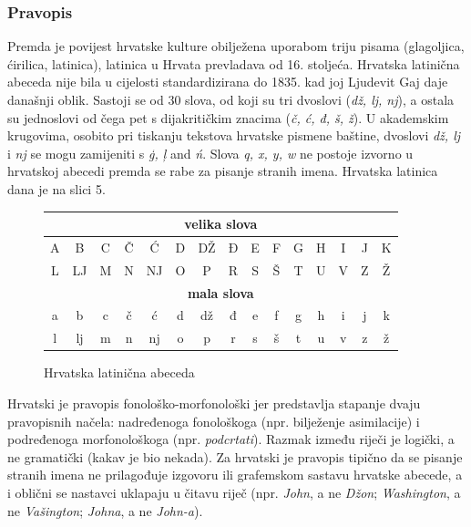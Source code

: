 \begin{multicols}{2}
\subsubsection{Pravopis}

Premda je povijest hrvatske kulture obilježena uporabom triju pisama (glagoljica, ćirilica, latinica), latinica u Hrvata prevladava od 16. stoljeća. Hrvatska latinična abeceda nije bila u cijelosti standardizirana do 1835. kad joj Ljudevit Gaj daje današnji oblik. Sastoji se od 30 slova, od koji su tri dvoslovi (\emph{dž, lj, nj}), a ostala su jednoslovi od čega pet s dijakritičkim znacima (\emph{č, ć, đ, š, ž}). U akademskim krugovima, osobito pri tiskanju tekstova hrvatske pismene baštine, dvoslovi \emph{dž, lj} i \emph{nj} se mogu zamijeniti s \emph{ģ, ļ} and \emph{ń}. Slova \emph{q, x, y, w} ne postoje izvorno u hrvatskoj abecedi premda se rabe za pisanje stranih imena. Hrvatska latinica dana je na slici 5.

\begin{figure}[htb]
\centering
	\begin{tabular} {|c|c|c|c|c|c|c|c|c|c|c|c|c|c|c|}
        \hline
        \multicolumn{15}{|c|}{\textbf{velika slova}} \\ \hline
        A & B  & C & Č & Ć  & D & DŽ & Đ & E & F & G & H & I & J & K \\ \hline
        L & LJ & M & N & NJ & O & P  & R & S & Š & T & U & V & Z & Ž \\ \hline
        \multicolumn{15}{|c|}{\textbf{mala slova}} \\ \hline
        a & b  & c & č & ć  & d & dž & đ & e & f & g & h & i & j & k \\ \hline
        l & lj & m & n & nj & o & p  & r & s & š & t & u & v & z & ž \\
        \hline
   \end{tabular}
  \caption{Hrvatska latinična abeceda}
  \label{fig:abeceda}
\end{figure}

Hrvatski je pravopis fonološko-morfonološki jer predstavlja stapanje dvaju pravopisnih načela: nadređenoga fonološkoga (npr. bilježenje asimilacije) i podređenoga morfonološkoga (npr. \emph{podcrtati}). Razmak između riječi je logički, a ne gramatički (kakav je bio nekada). Za hrvatski je pravopis tipično da se pisanje stranih imena ne prilagođuje izgovoru ili grafemskom sastavu hrvatske abecede, a i oblični se nastavci uklapaju u čitavu riječ (npr. \emph{John}, a ne \emph{Džon}; \emph{Washington}, a ne \emph{Vašington}; \emph{Johna}, a ne \emph{John-a}).


\end{multicols}
